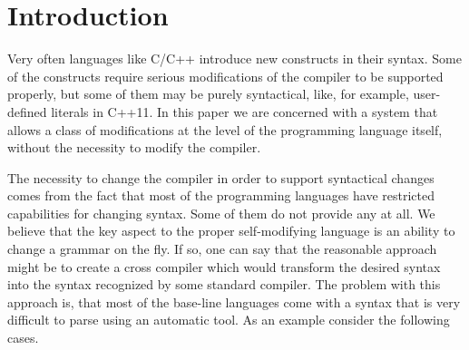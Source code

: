 \section{\label{sec:intro}Introduction}

Very often languages like C/C++ introduce new constructs in their
syntax.  Some of the constructs require serious modifications of the
compiler to be supported properly, but some of them may be purely syntactical,
like, for example, user-defined literals in C++11.  In this paper we are
concerned with a system that allows a class of modifications at the 
level of the programming language itself, without the necessity to
modify the compiler.

The necessity to change the compiler in order to support syntactical 
changes comes from the fact that most of the programming languages 
have restricted capabilities for changing syntax.  Some of them do not
provide any at all.  We believe that the key
aspect to the proper self-modifying language is an ability to 
change a grammar on the fly.  If so, one can say that the
reasonable approach might be to create a cross compiler which
would transform the desired syntax into the syntax recognized by
some standard compiler.  The problem with this approach is, that most of
the base-line languages come with a syntax that is very difficult
to parse using an automatic tool.  As an example consider the 
following cases.



